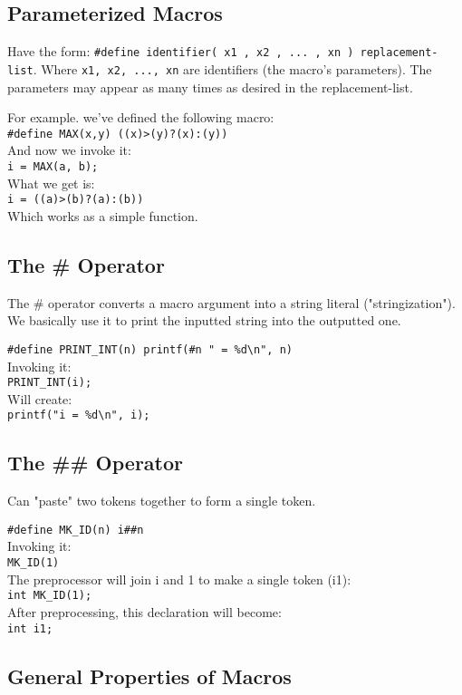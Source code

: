 \documentclass[openany]{book}
\begin{document}
    \subsection*{Parameterized Macros}

    Have the form: \texttt{\#define identifier( x1 , x2 , ... , xn ) replacement-list}. Where \texttt{x1, x2, ..., xn} are identifiers (the macro's parameters). The parameters may appear as many times as desired in the replacement-list.
    
    \bigskip

    For example. we've defined the following macro: \\
    \texttt{\#define MAX(x,y) ((x)>(y)?(x):(y))} \\
    And now we invoke it: \\
    \texttt{i = MAX(a, b);} \\
    What we get is: \\
    \texttt{i = ((a)>(b)?(a):(b))} \\
    Which works as a simple function.

    \subsection*{The \# Operator}

    The \# operator converts a macro argument into a string literal ("stringization"). We basically use it to print the inputted string into the outputted one.

    \bigskip

    \texttt{\#define PRINT\_INT(n) printf(\#n " = \%d\textbackslash n", n)} \\
    Invoking it: \\
    \texttt{PRINT\_INT(i);} \\
    Will create: \\
    \texttt{printf("i = \%d\textbackslash n", i);}

    \subsection*{The \#\# Operator}

    Can "paste" two tokens together to form a single token.

    \bigskip

    \texttt{\#define MK\_ID(n) i\#\#n} \\
    Invoking it: \\
    \texttt{MK\_ID(1)}\\
    The preprocessor will join i and 1 to make a single token (i1): \\
    \texttt{int MK\_ID(1);} \\
    After preprocessing, this declaration will become: \\
    \texttt{int i1;} \\
    
    \subsection*{General Properties of Macros}
\end{document}
